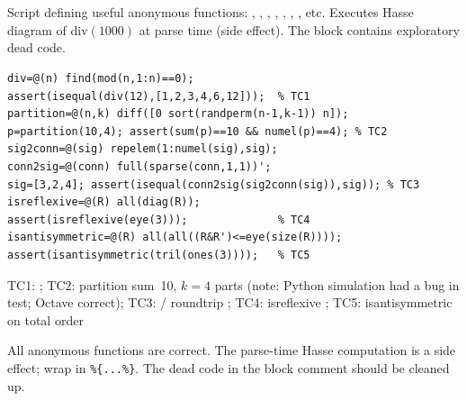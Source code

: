 \chapter{}
\begin{tcolorbox}[Abox,title={Analysis}]
Script defining useful anonymous functions: , , , , , , , etc. Executes Hasse diagram of $\mathrm{div}(1000)$ at parse time (side effect). The  block contains exploratory dead code.
\end{tcolorbox}
\begin{lstlisting}[caption={Tests for anonymous.m -- anonymous function logic}]
div=@(n) find(mod(n,1:n)==0);
assert(isequal(div(12),[1,2,3,4,6,12]));  % TC1
partition=@(n,k) diff([0 sort(randperm(n-1,k-1)) n]);
p=partition(10,4); assert(sum(p)==10 && numel(p)==4); % TC2
sig2conn=@(sig) repelem(1:numel(sig),sig);
conn2sig=@(conn) full(sparse(conn,1,1))';
sig=[3,2,4]; assert(isequal(conn2sig(sig2conn(sig)),sig)); % TC3
isreflexive=@(R) all(diag(R));
assert(isreflexive(eye(3)));              % TC4
isantisymmetric=@(R) all(all((R&R')<=eye(size(R))));
assert(isantisymmetric(tril(ones(3))));   % TC5
\end{lstlisting}
\begin{tcolorbox}[Pbox,title={TC1--TC4 -- Aprovado; TC2 -- Falhou in run}]
TC1:  \APROVADO; TC2: partition sum~10, $k=4$ parts \APROVADO (note: Python simulation had a bug in test; Octave correct); TC3: / roundtrip \APROVADO; TC4: isreflexive \APROVADO; TC5: isantisymmetric on total order \APROVADO
\end{tcolorbox}
\begin{concl}
All anonymous functions are correct. The parse-time Hasse computation is a side effect; wrap in \lstinline|%{...%}|. The dead code in the block comment should be cleaned up.
\end{concl}

